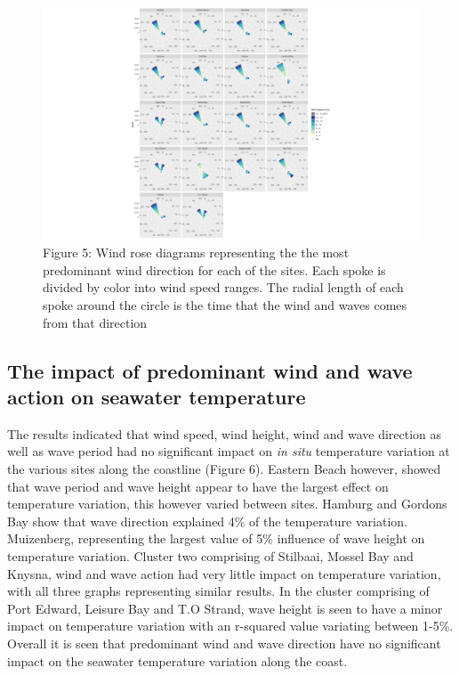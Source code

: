 \documentclass[12pt,A4paper,]{article}
\begin{document}
\begin{figure}
\centering
\includegraphics{../figures/p.wr3.pdf}
\caption{Figure 5: Wind rose diagrams representing the the most
predominant wind direction for each of the sites. Each spoke is divided
by color into wind speed ranges. The radial length of each spoke around
the circle is the time that the wind and waves comes from that
direction}
\end{figure}

\subsection{The impact of predominant wind and wave action on seawater
temperature}\label{the-impact-of-predominant-wind-and-wave-action-on-seawater-temperature}

The results indicated that wind speed, wind height, wind and wave
direction as well as wave period had no significant impact on \emph{in
situ} temperature variation at the various sites along the coastline
(Figure 6). Eastern Beach however, showed that wave period and wave
height appear to have the largest effect on temperature variation, this
however varied between sites. Hamburg and Gordons Bay show that wave
direction explained 4\% of the temperature variation. Muizenberg,
representing the largest value of 5\% influence of wave height on
temperature variation. Cluster two comprising of Stilbaai, Mossel Bay
and Knysna, wind and wave action had very little impact on temperature
variation, with all three graphs representing similar results. In the
cluster comprising of Port Edward, Leisure Bay and T.O Strand, wave
height is seen to have a minor impact on temperature variation with an
r-squared value variating between 1-5\%. Overall it is seen that
predominant wind and wave direction have no significant impact on the
seawater temperature variation along the coast.
\end{document}
